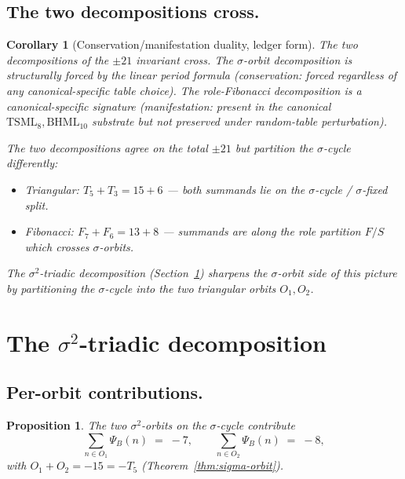 \documentclass[11pt,reqno]{amsart}
\theoremstyle{plain}
\newtheorem{proposition}[theorem]{Proposition}
\newtheorem{corollary}[theorem]{Corollary}
\theoremstyle{definition}
\theoremstyle{remark}
\newcommand{\TS}{\mathrm{TSML}}
\newcommand{\BH}{\mathrm{BHML}}
\newcommand{\sig}{\sigma}
\begin{document}
\subsection{The two decompositions cross.}
\begin{corollary}[Conservation/manifestation duality, ledger form]
\label{cor:duality}
The two decompositions of the $\pm 21$ invariant cross. The
$\sig$-orbit decomposition is structurally forced by the linear period
formula (conservation: forced regardless of any canonical-specific
table choice). The role-Fibonacci decomposition is a canonical-specific
signature (manifestation: present in the canonical $\TS_{8}, \BH_{10}$
substrate but not preserved under random-table perturbation).

The two decompositions agree on the total $\pm 21$ but partition the
$\sig$-cycle differently:
\begin{itemize}\setlength\itemsep{2pt}
\item Triangular: $T_{5} + T_{3} = 15 + 6$ — both summands lie on the
$\sig$-cycle / $\sig$-fixed split.
\item Fibonacci: $F_{7} + F_{6} = 13 + 8$ — summands are along the
role partition $F/S$ which crosses $\sig$-orbits.
\end{itemize}
The $\sig^{2}$-triadic decomposition (Section~\ref{sec:sigma-2-triadic})
sharpens the $\sig$-orbit side of this picture by partitioning the
$\sig$-cycle into the two triangular orbits $O_{1}, O_{2}$.
\end{corollary}

\section{The $\sigma^{2}$-triadic decomposition}
\label{sec:sigma-2-triadic}

\subsection{Per-orbit contributions.}
\begin{proposition}\label{prop:per-orbit}
The two $\sig^{2}$-orbits on the $\sig$-cycle contribute
\[
  \sum_{n \in O_{1}} \Psi_{B}(n) \;=\; -7,
  \qquad
  \sum_{n \in O_{2}} \Psi_{B}(n) \;=\; -8,
\]
with $O_{1} + O_{2} = -15 = -T_{5}$ (Theorem~\ref{thm:sigma-orbit}).
\end{proposition}
\end{document}
